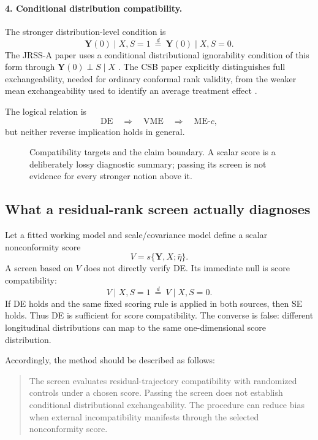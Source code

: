 \documentclass[11pt]{article}
\newcommand{\fullfig}[1]{\resizebox{\linewidth}{!}{}}
\begin{document}
\paragraph{4. Conditional distribution compatibility.}
The stronger distribution-level condition is
\[
\bm Y(0)\mid X,S=1
\ \overset{d}{=}\ 
\bm Y(0)\mid X,S=0.
\tag{DE}
\]
The JRSS-A paper uses a conditional distributional ignorability condition of this form through $\bm Y(0)\perp S\mid X$ \citep{zhou2025causal}. The CSB paper explicitly distinguishes full exchangeability, needed for ordinary conformal rank validity, from the weaker mean exchangeability used to identify an average treatment effect \citep{zhu2025csb}.

The logical relation is
\[
\text{DE}\quad\Longrightarrow\quad\text{VME}\quad\Longrightarrow\quad\text{ME-$c$},
\]
but neither reverse implication holds in general.

\begin{figure}[!ht]
\centering
\fullfig{compatibility_ladder.tex}
\caption{Compatibility targets and the claim boundary. A scalar score is a deliberately lossy diagnostic summary; passing its screen is not evidence for every stronger notion above it.}
\label{fig:compatibility-ladder}
\end{figure}

\subsection{What a residual-rank screen actually diagnoses}

Let a fitted working model and scale/covariance model define a scalar nonconformity score
\[
V=s\{\bm Y,X;\widehat\eta\}.
\]
A screen based on $V$ does not directly verify DE. Its immediate null is score compatibility:
\[
V\mid X,S=1\ \overset{d}{=}\ V\mid X,S=0.
\tag{SE}
\]
If DE holds and the same fixed scoring rule is applied in both sources, then SE holds. Thus DE is sufficient for score compatibility. The converse is false: different longitudinal distributions can map to the same one-dimensional score distribution.

Accordingly, the method should be described as follows:

\begin{quote}
The screen evaluates residual-trajectory compatibility with randomized controls under a chosen score. Passing the screen does not establish conditional distributional exchangeability. The procedure can reduce bias when external incompatibility manifests through the selected nonconformity score.
\end{quote}
\end{document}
